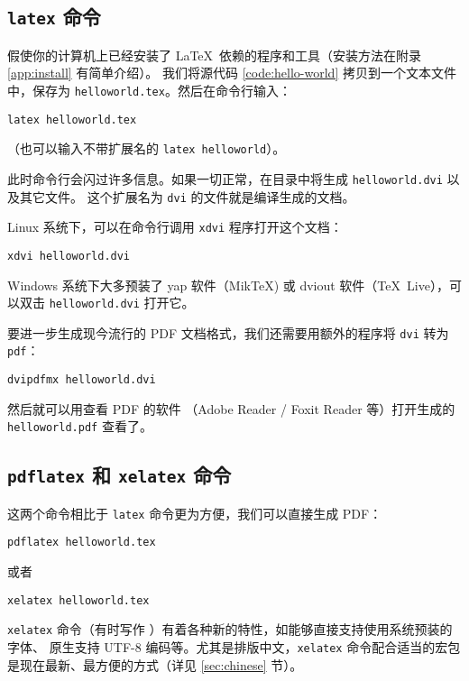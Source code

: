 \subsection{\texttt{latex} 命令}\label{subsec:latex-exe}

假使你的计算机上已经安装了 \LaTeX\ 依赖的程序和工具（安装方法在附录 \ref{app:install} 有简单介绍）。
我们将源代码 \ref{code:hello-world} 拷贝到一个文本文件中，保存为 \texttt{helloworld.tex}。然后在命令行输入：
\begin{verbatim}
latex helloworld.tex
\end{verbatim}
（也可以输入不带扩展名的 \texttt{latex helloworld}）。

此时命令行会闪过许多信息。如果一切正常，在目录中将生成 \texttt{hello\-world.dvi} 以及其它文件。
这个扩展名为 \texttt{dvi} 的文件就是编译生成的文档。

Linux 系统下，可以在命令行调用 \texttt{xdvi} 程序打开这个文档：
\begin{verbatim}
xdvi helloworld.dvi
\end{verbatim}

Windows 系统下大多预装了 yap 软件（Mik\TeX) 或 dviout 软件（\TeX\ Live），可以双击 \texttt{hello\-world.dvi} 打开它。

要进一步生成现今流行的 PDF 文档格式，我们还需要用额外的程序将 \texttt{dvi} 转为 \texttt{pdf}：
\begin{verbatim}
dvipdfmx helloworld.dvi
\end{verbatim}

然后就可以用查看 PDF 的软件 （Adobe Reader / Foxit Reader 等）打开生成的 \texttt{hello\-world.pdf} 查看了。

\subsection{\texttt{pdflatex} 和 \texttt{xelatex} 命令}\label{subsec:pdflatex-exe}

这两个命令相比于 \texttt{latex} 命令更为方便，我们可以直接生成 PDF：
\begin{verbatim}
pdflatex helloworld.tex
\end{verbatim}

或者
\begin{verbatim}
xelatex helloworld.tex
\end{verbatim}

\texttt{xelatex} 命令（有时写作 ）有着各种新的特性，如能够直接支持使用系统预装的字体、
原生支持 UTF-8 编码等。尤其是排版中文，\texttt{xelatex} 命令配合适当的宏包是现在最新、最方便的方式（详见 \ref{sec:chinese} 节）。

